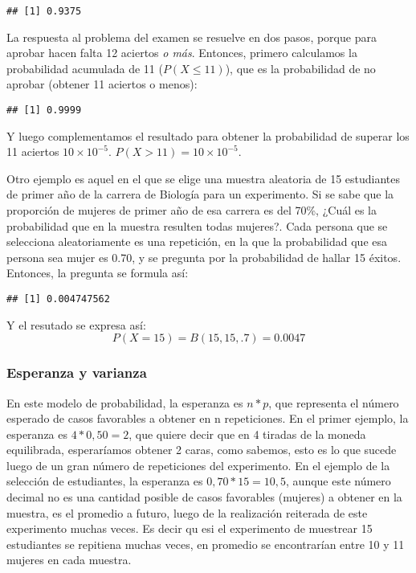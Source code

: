 \documentclass[]{article}
\begin{document}
\begin{verbatim}
## [1] 0.9375
\end{verbatim}

La respuesta al problema del examen se resuelve en dos pasos, porque
para aprobar hacen falta 12 aciertos \emph{o más}. Entonces, primero
calculamos la probabilidad acumulada de 11 (\(P(X\leq 11)\)), que es la
probabilidad de no aprobar (obtener 11 aciertos o menos):

\begin{verbatim}
## [1] 0.9999
\end{verbatim}

Y luego complementamos el resultado para obtener la probabilidad de
superar los 11 aciertos \ensuremath{10\times 10^{-5}}.
\(P(X>11)=\)\ensuremath{10\times 10^{-5}}.

Otro ejemplo es aquel en el que se elige una muestra aleatoria de 15
estudiantes de primer año de la carrera de Biología para un experimento.
Si se sabe que la proporción de mujeres de primer año de esa carrera es
del 70\%, ¿Cuál es la probabilidad que en la muestra resulten todas
mujeres?. Cada persona que se selecciona aleatoriamente es una
repetición, en la que la probabilidad que esa persona sea mujer es 0.70,
y se pregunta por la probabilidad de hallar 15 éxitos. Entonces, la
pregunta se formula así:

\begin{verbatim}
## [1] 0.004747562
\end{verbatim}

Y el resutado se expresa así: \[P(X=15)=B(15,15,.7)=0.0047\]

\hypertarget{esperanza-y-varianza}{%
\subsubsection{Esperanza y varianza}\label{esperanza-y-varianza}}

En este modelo de probabilidad, la esperanza es \(n*p\), que representa
el número esperado de casos favorables a obtener en n repeticiones. En
el primer ejemplo, la esperanza es \(4*0,50=2\), que quiere decir que en
4 tiradas de la moneda equilibrada, esperaríamos obtener 2 caras, como
sabemos, esto es lo que sucede luego de un gran número de repeticiones
del experimento. En el ejemplo de la selección de estudiantes, la
esperanza es \(0,70*15=10,5\), aunque este número decimal no es una
cantidad posible de casos favorables (mujeres) a obtener en la muestra,
es el promedio a futuro, luego de la realización reiterada de este
experimento muchas veces. Es decir qu esi el experimento de muestrear 15
estudiantes se repitiena muchas veces, en promedio se encontrarían entre
10 y 11 mujeres en cada muestra.
\end{document}
